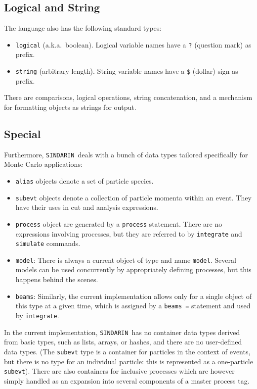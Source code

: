 \documentclass[12pt]{book}
\newcommand{\ttt}[1]{\texttt{#1}}
\newcommand{\sindarin}{\ttt{SINDARIN}}
\begin{document}
\subsection{Logical and String}

The language also has the following standard types:
\begin{itemize}
\item
   \ttt{logical} (a.k.a.\ boolean). Logical variable names have a
   \ttt{?} (question mark) as prefix.
\item
   \ttt{string} (arbitrary length).  String variable names have a \ttt{\$}
   (dollar) sign as prefix.
\end{itemize}
There are comparisons, logical operations, string concatenation, and a
mechanism for formatting objects as strings for output.


\subsection{Special}

Furthermore, \sindarin\ deals with a bunch of data types tailored
specifically for Monte Carlo applications:
\begin{itemize}
\item
  \ttt{alias} objects denote a set of particle species.
\item
  \ttt{subevt} objects denote a collection of particle momenta within an
  event.  They have their uses in cut and analysis expressions.
\item
  \ttt{process} object are generated by a \ttt{process} statement.
  There are no expressions involving processes, but they are referred
  to by \ttt{integrate} and \ttt{simulate} commands.
\item
  \ttt{model}: There is always a current object of type and name
  \ttt{model}.  Several models can be used concurrently by
  appropriately defining processes, but this happens behind the scenes.
\item
  \ttt{beams}: Similarly, the current implementation allows only for a single
  object of this type at a given time, which is assigned by a \ttt{beams =}
  statement and used by \ttt{integrate}.
\end{itemize}

In the current implementation, \sindarin\ has no container data types
derived from basic types, such as lists, arrays, or hashes, and there
are no user-defined data types.  (The \ttt{subevt} type is a container
for particles in the context of events, but there is no type for an
individual particle: this is represented as a one-particle
\ttt{subevt}). There are also containers for inclusive processes which
are however simply handled as an expansion into several components of
a master process tag.
\end{document}
